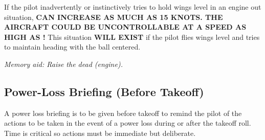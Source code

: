 If the pilot inadvertently or instinctively tries to hold wings level in an engine out situation, \vmc
\textbf{CAN INCREASE AS MUCH AS 15 KNOTS. THE AIRCRAFT COULD BE UNCONTROLLABLE AT A
SPEED AS HIGH AS \vyse!} This situation \textbf{WILL EXIST} if the pilot flies wings level and tries to maintain heading
with the ball centered.

\emph{Memory aid: Raise the dead (engine).}

\subsection{Power-Loss Briefing (Before Takeoff)}

A power loss briefing is to be given before takeoff to remind the pilot of the actions to be taken in the event of a
power loss during or after the takeoff roll. Time is critical so actions must be immediate but deliberate.


